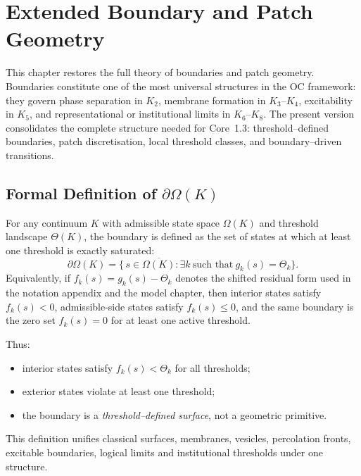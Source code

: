
\section{Extended Boundary and Patch Geometry}
\label{sec:boundary-extended}

This chapter restores the full theory of boundaries and patch geometry.
Boundaries constitute one of the most universal structures in the OC framework:
they govern phase separation in \(K_2\), membrane formation in \(K_3\)--\(K_4\),
excitability in \(K_5\), and representational or institutional limits in
\(K_6\)--\(K_8\).  
The present version consolidates the complete structure needed for Core~1.3:
threshold–defined boundaries, patch discretisation, local threshold classes,
and boundary–driven transitions.

\subsection{Formal Definition of \texorpdfstring{$\partial\Omega(K)$}{boundary}}

For any continuum \(K\) with admissible state space \(\Omega(K)\) and threshold
landscape \(\Theta(K)\), the boundary is defined as the set of states at which
at least one threshold is exactly saturated:
\[
  \partial\Omega(K)
  =
  \big\{\, s \in \overline{\Omega(K)} :
          \exists k\ \text{such that}\ g_k(s) = \Theta_k \big\}.
\]
Equivalently, if \(f_k(s)=g_k(s)-\Theta_k\) denotes the shifted residual form
used in the notation appendix and the model chapter, then interior states
satisfy \(f_k(s)<0\), admissible-side states satisfy \(f_k(s)\le0\), and the
same boundary is the zero set \(f_k(s)=0\) for at least one active threshold.

Thus:
\begin{itemize}
    \item interior states satisfy \(f_k(s) < \Theta_k\) for all thresholds;
    \item exterior states violate at least one threshold;
    \item the boundary is a \emph{threshold–defined surface}, not a geometric
          primitive.
\end{itemize}

This definition unifies classical surfaces, membranes, vesicles,
percolation fronts, excitable boundaries, logical limits and institutional
thresholds under one structure.

